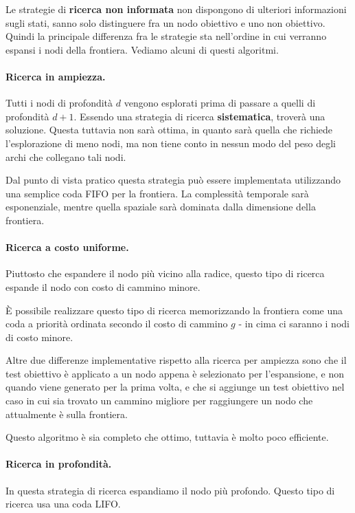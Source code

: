             Le strategie di \textbf{ricerca non informata} non dispongono di ulteriori informazioni sugli stati, sanno solo distinguere fra un nodo obiettivo e uno non obiettivo. Quindi la principale differenza fra le strategie sta nell'ordine in cui verranno espansi i nodi della frontiera. Vediamo alcuni di questi algoritmi.
            
            \paragraph{Ricerca in ampiezza.} Tutti i nodi di profondità $d$ vengono esplorati prima di passare a quelli di profondità $d+1$. Essendo una strategia di ricerca \textbf{sistematica}, troverà una soluzione. Questa tuttavia non sarà ottima, in quanto sarà quella che richiede l'esplorazione di meno nodi, ma non tiene conto in nessun modo del peso degli archi che collegano tali nodi.
            
            Dal punto di vista pratico questa strategia può essere implementata utilizzando una semplice coda FIFO per la frontiera. La complessità temporale sarà esponenziale, mentre quella spaziale sarà dominata dalla dimensione della frontiera.
            
            \paragraph{Ricerca a costo uniforme.} Piuttosto che espandere il nodo più vicino alla radice, questo tipo di ricerca espande il nodo con costo di cammino minore.
            
            È possibile realizzare questo tipo di ricerca memorizzando la frontiera come una coda a priorità ordinata secondo il costo di cammino $g$ - in cima ci saranno i nodi di costo minore.
            
            Altre due differenze implementative rispetto alla ricerca per ampiezza sono che il test obiettivo è applicato a un nodo appena è selezionato per l'espansione, e non quando viene generato per la prima volta, e che si aggiunge un test obiettivo nel caso in cui sia trovato un cammino migliore per raggiungere un nodo che attualmente è sulla frontiera.
            
            Questo algoritmo è sia completo che ottimo, tuttavia è molto poco efficiente.
            
            \paragraph{Ricerca in profondità.} In questa strategia di ricerca espandiamo il nodo più profondo. Questo tipo di ricerca usa una coda LIFO.
            
